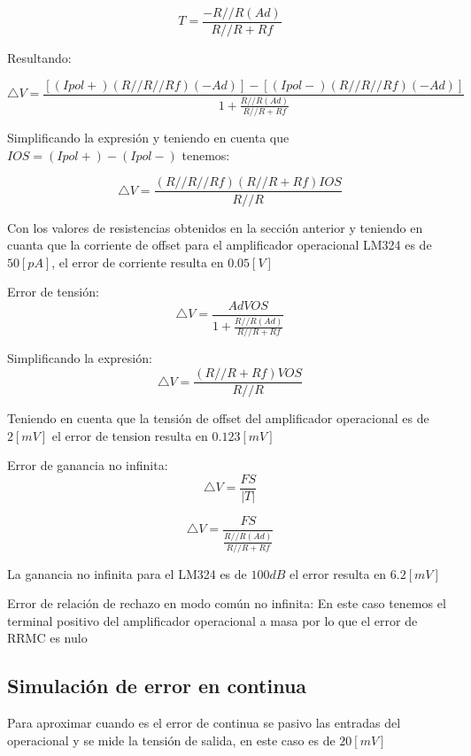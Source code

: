 \documentclass[12pt]{article}
\begin{document}
	
	\begin{equation}
		T=\frac{-R//R(Ad)}{R//R+Rf}
	\end{equation}
	
	Resultando:
	
	\begin{equation}
		\bigtriangleup V = \frac{[(Ipol+)(R//R//Rf)(-Ad)]-[(Ipol-)(R//R//Rf)(-Ad)]}{1+ \frac{R//R(Ad)}{R//R+Rf}}
	\end{equation}
	
	Simplificando la expresión y teniendo en cuenta que $IOS=(Ipol+)-(Ipol-)$ tenemos:
	
	\begin{equation}
		\bigtriangleup V = \frac{(R//R//Rf)(R//R+Rf)IOS}{R//R}
	\end{equation}
	
	Con los valores de resistencias obtenidos en la sección anterior y teniendo en cuanta que la corriente de offset para el amplificador operacional LM324 es de $ 50[pA]$, el error de corriente resulta en $0.05[V]$
	
	Error de tensión:
	\begin{equation}
		\bigtriangleup V = \frac{Ad VOS}{1+\frac{R//R(Ad)}{R//R+Rf}}
	\end{equation}
	
	Simplificando la expresión:
	\begin{equation}
		\bigtriangleup V = \frac{(R//R+Rf)VOS}{R//R}
	\end{equation}
	
	Teniendo en cuenta que la tensión de offset del amplificador operacional es de $2[mV]$ el error de tension resulta en $0.123[mV]$
	
	Error de ganancia no infinita:
	\begin{equation}
		\bigtriangleup V = \frac{FS}{|T|}
	\end{equation}
	
	\begin{equation}
		\bigtriangleup V = \frac{FS}{\frac{R//R(Ad)}{R//R+Rf}}
	\end{equation}
	
	La ganancia no infinita para el LM324 es de $100dB$ el error resulta en $6.2[mV]$
	
	Error de relación de rechazo en modo común no infinita:
	En este caso tenemos el terminal positivo del amplificador operacional a masa por lo que el error de RRMC es nulo
	
	\subsection{Simulación de error en continua}
	Para aproximar cuando es el error de continua se pasivo las entradas del operacional y se mide la tensión de salida, en este caso es de $20[mV]$
	
\end{document}
